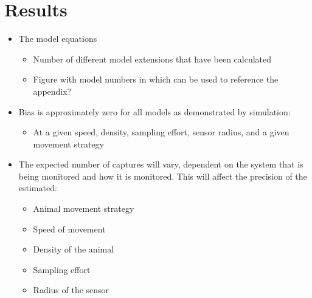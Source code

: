 \documentclass[a4paper,10pt,reqno,oneside]{amsart}
\begin{document}
\section{Results}

\begin{itemize}
\item The model equations
	\begin{itemize}
	\item Number of different model extensions that have been calculated
	\item Figure with model numbers in which can be used to reference the appendix?
	\end{itemize}
\item Bias is approximately zero for all models as demonstrated by simulation: 
	\begin{itemize}
	\item At a given speed, density, sampling effort, sensor radius, and a given movement strategy
	\end{itemize}
\item The expected number of captures will vary, dependent on the system that is being monitored and how it is monitored. This will affect the precision of the estimated: 
	\begin{itemize}
	\item Animal movement strategy
	\item Speed of movement
	\item Density of the animal
	\item Sampling effort
	\item Radius of the sensor
	\end{itemize}
\end{itemize}
\end{document}
